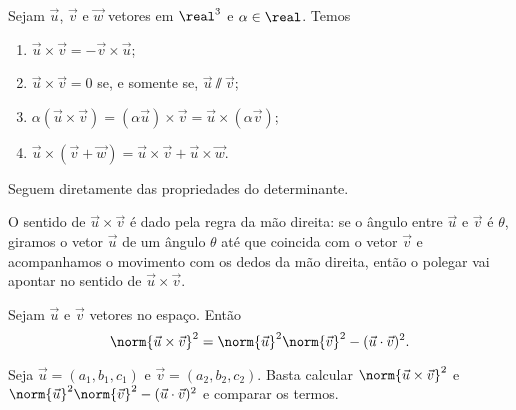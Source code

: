\begin{proposicao}
  Sejam $\vec{u}$, $\vec{v}$ e $\vec{w}$ vetores em $\real^3$ e $\alpha \in \real$. Temos
  \begin{enumerate}
    \item $\vec{u}\times\vec{v} = -\vec{v}\times\vec{u}$;
    \item $\vec{u}\times\vec{v} = 0$ se, e somente se, $\vec{u}\varparallel\vec{v}$;
    \item $\alpha(\vec{u}\times\vec{v}) = (\alpha\vec{u})\times\vec{v} = \vec{u}\times(\alpha\vec{v})$;
    \item $\vec{u}\times(\vec{v} + \vec{w}) = \vec{u}\times\vec{v} + \vec{u}\times\vec{w}$.
  \end{enumerate}
\end{proposicao}
\begin{prova}
  Seguem diretamente das propriedades do determinante.
\end{prova}

\begin{observacao}
  O sentido de $\vec{u}\times\vec{v}$ \'e dado pela regra da m\~ao direita: se o \^angulo entre $\vec{u}$ e $\vec{v}$ \'e $\theta$, giramos o vetor $\vec{u}$ de um \^angulo $\theta$ at\'e que coincida com o vetor $\vec{v}$ e acompanhamos o movimento com os dedos da m\~ao direita, ent\~ao o polegar vai apontar no sentido de $\vec{u}\times\vec{v}$.
\end{observacao}

\begin{proposicao}\label{normaprodutovetorial}
  Sejam $\vec{u}$ e $\vec{v}$ vetores no espa\c{c}o. Ent\~ao
  \begin{equation}
    \norm{\vec{u}\times\vec{v}}^2 = \norm{\vec{u}}^2\norm{\vec{v}}^2 - (\vec{u}\cdot\vec{v})^2.
  \end{equation}
\end{proposicao}
\begin{prova}
  Seja $\vec{u} = (a_1,b_1,c_1)$ e $\vec{v} = (a_2,b_2,c_2)$. Basta calcular $\norm{\vec{u}\times\vec{v}}^2$ e $\norm{\vec{u}}^2\norm{\vec{v}}^2 - (\vec{u}\cdot\vec{v})^2$  e comparar os termos.
\end{prova}


